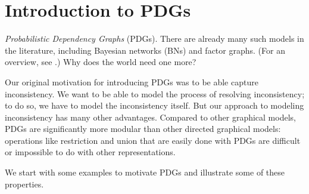 \documentclass[the-pdg-manual.tex]{subfiles}
\begin{document}
\section{Introduction to PDGs}

\emph{Probabilistic Dependency Graphs} (PDGs). There are already many
such models in the literature, including Bayesian networks (BNs) and
factor graphs. (For an overview, see \citeauthor{KF09}.)
Why does the world need one more?  

Our original motivation for introducing PDGs was to be able capture
inconsistency. We want to be able to model the process of resolving
inconsistency; to do so, we have to model the inconsistency itself. But our
approach to modeling inconsistency has many other advantages. 
Compared to other graphical models, PDGs are significantly more modular than other directed graphical models:
operations like restriction and union that are easily done with PDGs are
difficult or impossible to do with other representations.

We start with some examples to motivate PDGs and illustrate some of these properties.  
\end{document}
